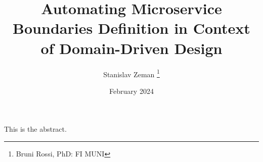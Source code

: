 \documentclass[letterpaper,12pt,leqno]{article}
\begin{document}
\title{Automating Microservice Boundaries Definition in Context of Domain-Driven Design}
\author{Stanislav Zeman
\thanks{Bruni Rossi, PhD: FI MUNI}}
\date{February 2024}                       


\begin{titlepage}
\maketitle

This is the abstract. 

\end{titlepage}
\end{document}
